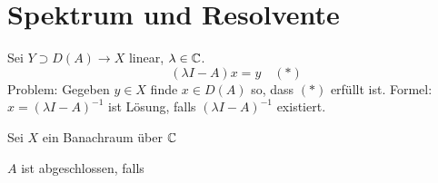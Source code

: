 
\section{Spektrum und Resolvente}



Sei $Y \supset D(A) \rightarrow X$ linear, $\lambda \in \mathbb{C}$.
	\[ (\lambda I - A) x = y \quad (*) \label{eq:13.0-lineareGleichung} \]
Problem: Gegeben $y \in X$ finde $x \in D(A)$ so, dass \hyperref[eq:13.0-lineareGleichung]{$(*)$} erfüllt ist.
Formel: $x = (\lambda I - A)^{-1}$ ist Lösung, falls $(\lambda I - A)^{-1}$ existiert.


\begin{definition}
	Sei $X$ ein Banachraum über $\mathbb{C}$	
\end{definition}


\begin{bemerkung}
	$A$ ist abgeschlossen, falls	
\end{bemerkung}



\newpage